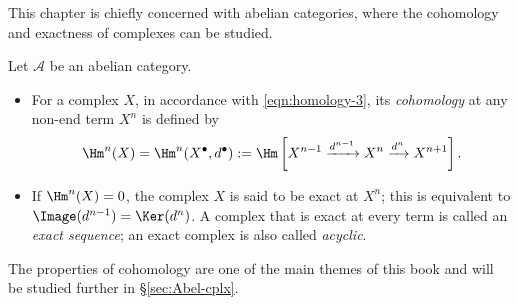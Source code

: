This chapter is chiefly concerned with abelian categories, where the
cohomology and exactness of complexes can be studied.

\begin{definition}\label{def:cohomology}
	Let $\mathcal{A}$ be an abelian category.
	\begin{itemize}
		\item For a complex $X$, in accordance with \eqref{eqn:homology-3}, its
		\emph{cohomology} at any non-end term $X^n$ is defined by
		\[ \Hm^n(X) = \Hm^n(X^\bullet, d^\bullet) := \Hm\left[ X^{n-1} \xrightarrow{d^{n-1}} X^n \xrightarrow{d^n} X^{n+1}  \right]. \]
		\item If $\Hm^n(X)=0$, the complex $X$ is said to be exact at $X^n$;
		this is equivalent to $\Image(d^{n-1})=\Ker(d^n)$. A complex that is
		exact at every term is called an \emph{exact sequence}; an exact complex
		is also called \emph{acyclic}.
	\end{itemize}
\end{definition}

The properties of cohomology are one of the main themes of this book and will
be studied further in \S\ref{sec:Abel-cplx}.

